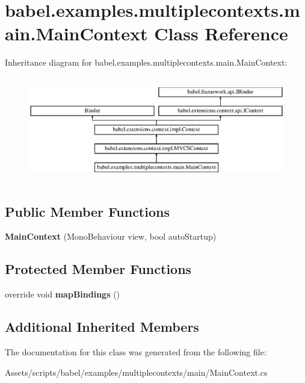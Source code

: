 \hypertarget{classbabel_1_1examples_1_1multiplecontexts_1_1main_1_1_main_context}{\section{babel.\-examples.\-multiplecontexts.\-main.\-Main\-Context Class Reference}
\label{classbabel_1_1examples_1_1multiplecontexts_1_1main_1_1_main_context}
}
Inheritance diagram for babel.\-examples.\-multiplecontexts.\-main.\-Main\-Context\-:\begin{figure}[H]
\begin{center}
\leavevmode
\includegraphics[height=4.620462cm]{classbabel_1_1examples_1_1multiplecontexts_1_1main_1_1_main_context}
\end{center}
\end{figure}
\subsection*{Public Member Functions}
\begin{DoxyCompactItemize}
\item 
\hypertarget{classbabel_1_1examples_1_1multiplecontexts_1_1main_1_1_main_context_a911a82980686e98c8475cee213e623a8}{{\bfseries Main\-Context} (Mono\-Behaviour view, bool auto\-Startup)}\label{classbabel_1_1examples_1_1multiplecontexts_1_1main_1_1_main_context_a911a82980686e98c8475cee213e623a8}

\end{DoxyCompactItemize}
\subsection*{Protected Member Functions}
\begin{DoxyCompactItemize}
\item 
\hypertarget{classbabel_1_1examples_1_1multiplecontexts_1_1main_1_1_main_context_a44cfcd3a2b42138841b002fa981532eb}{override void {\bfseries map\-Bindings} ()}\label{classbabel_1_1examples_1_1multiplecontexts_1_1main_1_1_main_context_a44cfcd3a2b42138841b002fa981532eb}

\end{DoxyCompactItemize}
\subsection*{Additional Inherited Members}


The documentation for this class was generated from the following file\-:\begin{DoxyCompactItemize}
\item 
Assets/scripts/babel/examples/multiplecontexts/main/Main\-Context.\-cs\end{DoxyCompactItemize}

